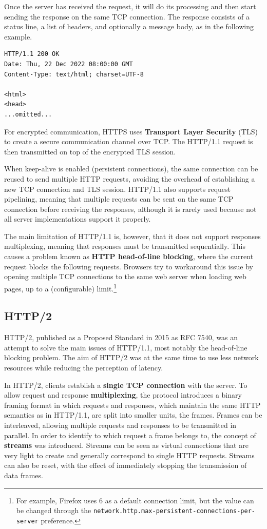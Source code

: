 Once the server has received the request, it will do its processing and then start sending the response on the same TCP connection. The response consists of a status line, a list of headers, and optionally a message body, as in the following example.

\begin{verbatim}
HTTP/1.1 200 OK
Date: Thu, 22 Dec 2022 08:00:00 GMT
Content-Type: text/html; charset=UTF-8

<html>
<head>
...omitted...
\end{verbatim}

For encrypted communication, HTTPS uses \textbf{Transport Layer Security} (TLS) to create a secure communication channel over TCP. The HTTP/1.1 request is then transmitted on top of the encrypted TLS session.

When keep-alive is enabled (persistent connections), the same connection can be reused to send multiple HTTP requests, avoiding the overhead of establishing a new TCP connection and TLS session. HTTP/1.1 also supports request pipelining, meaning that multiple requests can be sent on the same TCP connection before receiving the responses, although it is rarely used because not all server implementations support it properly.

The main limitation of HTTP/1.1 is, however, that it does not support responses multiplexing, meaning that responses must be transmitted sequentially. This causes a problem known as \textbf{HTTP head-of-line blocking}, where the current request blocks the following requests. Browsers try to workaround this issue by opening multiple TCP connections to the same web server when loading web pages, up to a (configurable) limit.\footnote{For example, Firefox uses 6 as a default connection limit, but the value can be changed through the \texttt{network.http.max-persistent-connections-per-server} preference.} 

\subsection{HTTP/2}
\label{sec:bg/http2}

HTTP/2, published as a Proposed Standard in 2015 as RFC 7540, was an attempt to solve the main issues of HTTP/1.1, most notably the head-of-line blocking problem. The aim of HTTP/2 was at the same time to use less network resources while reducing the perception of latency.\cite{http2}

In HTTP/2, clients establish a \textbf{single TCP connection} with the server. To allow request and response \textbf{multiplexing}, the protocol introduces a binary framing format in which requests and responses, which maintain the same HTTP semantics as in HTTP/1.1, are split into smaller units, the frames. Frames can be interleaved, allowing multiple requests and responses to be transmitted in parallel. In order to identify to which request a frame belongs to, the concept of \textbf{streams} was introduced. Streams can be seen as virtual connections that are very light to create and generally correspond to single HTTP requests. Streams can also be reset, with the effect of immediately stopping the transmission of data frames.

